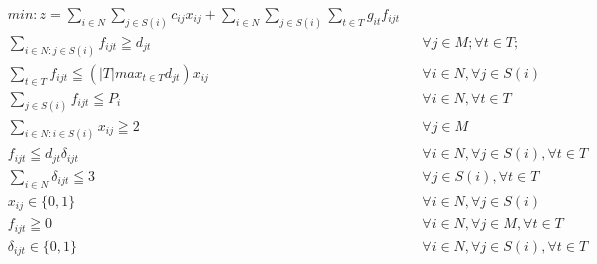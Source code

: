 \documentclass{article}
\begin{document}
\begin{align*}
&min: z= \displaystyle \sum_{i \in N} \sum_{j \in S(i)} c_{ij}x_{ij} + \sum_{i \in N} \sum_{j \in S(i)}\sum_{t \in T}g_{it}f_{ijt}\\
    	&\sum_{i \in N:j \in S(i)}f_{ijt} \geqq d_{jt} & &\forall j \in M; \forall t \in T;\\
    	&\displaystyle \sum_{t \in T} f_{ijt} \leqq (|T|max_{t\in T} d_{jt})x_{ij} & &\forall i \in N,\forall j \in S(i) \\
    	&\displaystyle \sum_{j \in S(i)} f_{ijt} \leqq P_i & &\forall i \in N,\forall t \in T\\
    	&\displaystyle \sum_{i \in N: i \in S(i)} x_{ij} \geqq 2 & &\forall j \in M\\
		&f_{ijt} \leqq d_{jt}\delta_{ijt} & &\forall i \in N,\forall j \in S(i),\forall t \in T\\  
		&\displaystyle \sum_{i \in N} \delta_{ijt} \leqq 3 & &\forall j \in S(i),\forall t \in T\\
    	&x_{ij} \in \{0,1\} & &\forall i \in N,\forall j \in S(i)\\
    	&f_{ijt} \geqq 0 & &\forall i \in N,\forall j \in M,\forall t \in T\\
    	&\delta_{ijt} \in \{0,1\} & &\forall i \in N,\forall j \in S(i),\forall t \in T
\end{align*}
\end{document}
